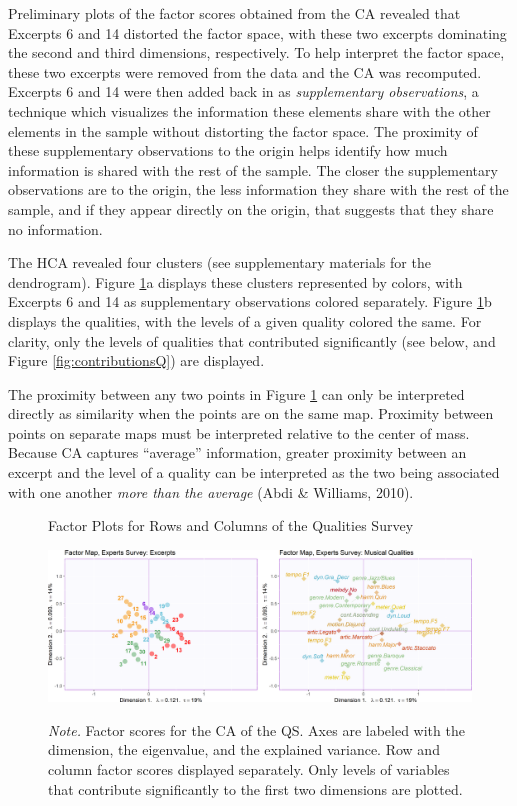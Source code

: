 \documentclass[
  english,
  man,floatsintext]{apa6}
\begin{document}
Preliminary plots of the factor scores obtained from the CA revealed that Excerpts 6 and 14 distorted the factor space, with these two excerpts dominating the second and third dimensions, respectively. To help interpret the factor space, these two excerpts were removed from the data and the CA was recomputed. Excerpts 6 and 14 were then added back in as \emph{supplementary observations}, a technique which visualizes the information these elements share with the other elements in the sample without distorting the factor space. The proximity of these supplementary observations to the origin helps identify how much information is shared with the rest of the sample. The closer the supplementary observations are to the origin, the less information they share with the rest of the sample, and if they appear directly on the origin, that suggests that they share no information.

The HCA revealed four clusters (see supplementary materials for the dendrogram). Figure \ref{fig:factormapsQ}a displays these clusters represented by colors, with Excerpts 6 and 14 as supplementary observations colored separately. Figure \ref{fig:factormapsQ}b displays the qualities, with the levels of a given quality colored the same. For clarity, only the levels of qualities that contributed significantly (see below, and Figure \ref{fig:contributionsQ}) are displayed.

The proximity between any two points in Figure \ref{fig:factormapsQ} can only be interpreted directly as similarity when the points are on the same map. Proximity between points on separate maps must be interpreted relative to the center of mass. Because CA captures ``average'' information, greater proximity between an excerpt and the level of a quality can be interpreted as the two being associated with one another \emph{more than the average} (Abdi \& Williams, 2010).

\begin{figure}   
  \centering  
  \caption{Factor Plots for Rows and Columns of the Qualities Survey}
    \includegraphics{./Music-Descriptor-Space_files/figure-latex/factormapsQ-1.png}
  \label{fig:factormapsQ}
  \caption*{\footnotesize \textit{Note.}  Factor scores for the CA of the QS. Axes are labeled with the dimension, the eigenvalue, and the explained variance. Row and column factor scores displayed separately. Only levels of variables that contribute significantly to the first two dimensions are plotted.}
\end{figure}
\end{document}

